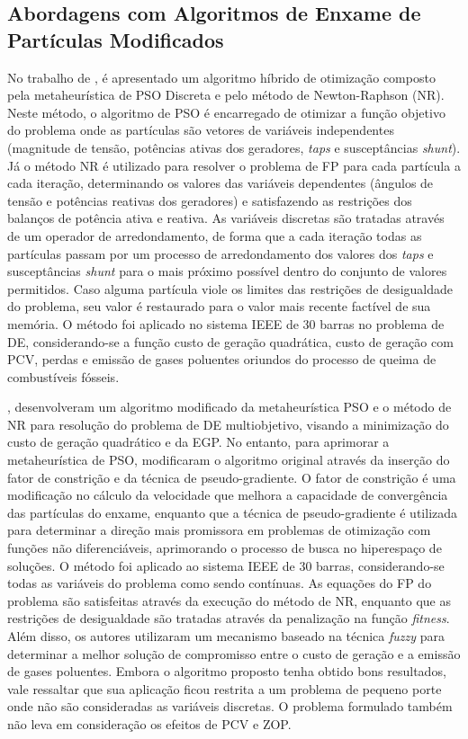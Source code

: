 

\subsection{Abordagens com Algoritmos de Enxame de Partículas Modificados}


No trabalho de , é apresentado um algoritmo híbrido de otimização composto pela metaheurística de PSO Discreta e pelo método de Newton-Raphson (NR). Neste método, o algoritmo de PSO é encarregado de otimizar a função objetivo do problema onde as partículas são vetores de variáveis independentes (magnitude de tensão, potências ativas dos geradores, \emph{taps} e susceptâncias \emph{shunt}). Já o método NR é utilizado para resolver o problema de FP para cada partícula a cada iteração, determinando os valores das variáveis dependentes (ângulos de tensão e potências reativas dos geradores) e satisfazendo as restrições dos balanços de potência ativa e reativa. As variáveis discretas são tratadas através de um operador de arredondamento, de forma que a cada iteração todas as partículas passam por um processo de arredondamento dos valores dos \emph{taps} e susceptâncias \emph{shunt} para o mais próximo possível dentro do conjunto de valores permitidos. Caso alguma partícula viole os limites das restrições de desigualdade do problema, seu valor é restaurado para o valor mais recente factível de sua memória. O método foi aplicado no sistema IEEE de 30 barras no problema de DE, considerando-se a função custo de geração quadrática, custo de geração com PCV, perdas e emissão de gases poluentes oriundos do processo de queima de combustíveis fósseis.


, desenvolveram um algoritmo modificado da metaheurística PSO e o método de NR para resolução do problema de DE multiobjetivo, visando a minimização do custo de geração quadrático e da EGP. No entanto, para aprimorar a metaheurística de PSO, modificaram o algoritmo original através da inserção do fator de constrição e da técnica de pseudo-gradiente. O fator de constrição é uma modificação no cálculo da velocidade que melhora a capacidade de convergência das partículas do enxame, enquanto que a técnica de pseudo-gradiente é utilizada para determinar a direção mais promissora em problemas de otimização com funções não diferenciáveis, aprimorando o processo de busca no hiperespaço de soluções. O método foi aplicado ao sistema IEEE de 30 barras, considerando-se todas as variáveis do problema como sendo contínuas. As equações do FP do problema são satisfeitas através da execução do método de NR, enquanto que as restrições de desigualdade são tratadas através da penalização na função \emph{fitness}. Além disso, os autores utilizaram um mecanismo baseado na técnica \emph{fuzzy} para determinar a melhor solução de compromisso entre o custo de geração e a emissão de gases poluentes. Embora o algoritmo proposto tenha obtido bons resultados, vale ressaltar que sua aplicação ficou restrita a um problema de pequeno porte onde não são consideradas as variáveis discretas. O problema formulado também não leva em consideração os efeitos de PCV e ZOP.


